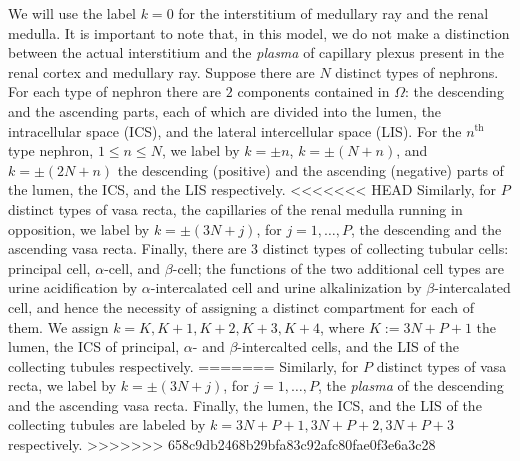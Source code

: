 \documentclass{article}
\begin{document}
We will use the label
$k=0$ for the interstitium of medullary ray and the renal medulla.
It is important to note that, in this model, we do not make a distinction between the actual interstitium and the \textit{plasma} of capillary plexus present in the renal cortex and medullary ray.
Suppose there are $N$ distinct types of nephrons.
For each type of nephron there are $2$ components contained in $\Omega$: the descending and the ascending parts, each of which are divided into the lumen, the intracellular space (ICS), and the lateral intercellular space (LIS).
For the $n^{\mathrm{th}}$ type nephron, $1\leq n\leq N$, we label by $k=\pm n$, $k=\pm(N+n)$, and $k=\pm(2N+n)$ the descending (positive) and the ascending (negative) parts of the lumen, the ICS, and the LIS respectively.
<<<<<<< HEAD
Similarly, for $P$ distinct types of vasa recta, the capillaries of the renal medulla running in opposition, we label by $k=\pm(3N+j)$, for $j=1,\dots,P$, the descending and the ascending vasa recta.
Finally, there are 3 distinct types of collecting tubular cells: principal cell, $\alpha$-cell, and $\beta$-cell; the functions of the two additional cell types are urine acidification by $\alpha$-intercalated cell and urine alkalinization by $\beta$-intercalated cell, and hence the necessity of assigning a distinct compartment for each of them.
We assign $k=K,K+1,K+2,K+3,K+4$, where $K:=3N+P+1$ the lumen, the ICS of principal, $\alpha$- and $\beta$-intercalted cells, and the LIS of the collecting tubules respectively.
=======
Similarly, for $P$ distinct types of vasa recta, we label by $k=\pm(3N+j)$, for $j=1,\dots,P$, the \textit{plasma} of the descending and the ascending vasa recta.
Finally, the lumen, the ICS, and the LIS of the collecting tubules are labeled by $k=3N+P+1,3N+P+2,3N+P+3$ respectively.
>>>>>>> 658c9db2468b29bfa83c92afc80fae0f3e6a3c28
\end{document}
